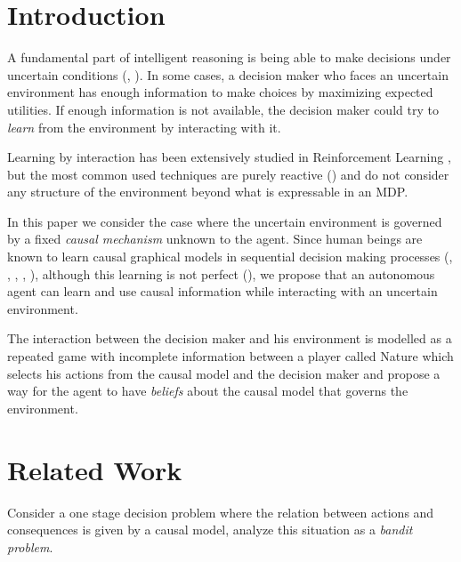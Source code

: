 \documentclass{article}
\begin{document}

\section{Introduction}
A fundamental part of intelligent reasoning  is being able to make decisions under uncertain conditions (\cite{lake2017building}, \cite{danks2014unifying}). In some cases, a decision maker who faces an uncertain environment has enough information to make choices by maximizing expected utilities. If enough information is not available, the decision maker could try to \textit{learn} from the environment by interacting with it.

Learning by interaction has been extensively studied in Reinforcement Learning \cite{sutton1998reinforcement}, but the most common used techniques are purely reactive (\cite{garnelo2016towards}) and do not consider any structure of the environment beyond what is expressable in an MDP.

In this paper we consider the case where the uncertain environment is governed by a fixed \textit{causal mechanism} unknown to the agent. Since human beings are known to learn causal graphical models in sequential decision making processes (\cite{sloman2006causal}, \cite{nichols2007decision}, \cite{meder2010observing}, \cite{hagmayer2013repeated}, \cite{danks2014unifying}), although this learning is not perfect (\cite{rottman2014reasoning}), we propose that an autonomous agent can learn and use causal information while interacting with an uncertain environment.

The interaction between the decision maker and his environment is modelled as a repeated game with incomplete information between a player called Nature which selects his actions from the causal model and the decision maker and propose a way for the agent to have \textit{beliefs} about the causal model that governs the environment.

\section{Related Work}
Consider a one stage decision problem where the relation between actions and consequences is given by a causal model, \cite{lattimoreNIPS2016} analyze this situation as a \textit{bandit problem}.
\end{document}
